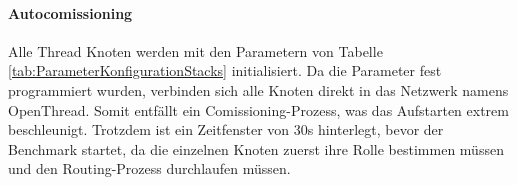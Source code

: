 \begin{table}[h]
	\caption{Parameter zu Konfiguration des Stacks}
	\label{tab:ParameterKonfigurationStacks}
\end{table}

\paragraph{Autocomissioning}
Alle Thread Knoten werden mit den Parametern von Tabelle \ref{tab:ParameterKonfigurationStacks} initialisiert. Da die Parameter fest programmiert wurden, verbinden sich alle Knoten direkt in das Netzwerk namens OpenThread. Somit entfällt ein Comissioning-Prozess, was das Aufstarten extrem beschleunigt. Trotzdem ist ein Zeitfenster von 30s hinterlegt, bevor der Benchmark startet, da die einzelnen Knoten zuerst ihre Rolle bestimmen müssen und den Routing-Prozess durchlaufen müssen.

